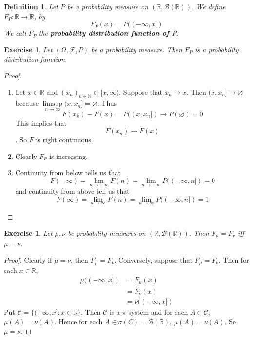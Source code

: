 \documentclass[12pt]{amsart}
\newtheorem{defn}[thm]{Definition}
\newtheorem{ex}[thm]{Exercise}
\newcommand{\sig}{\sigma}
\newcommand{\Om}{\Omega}
\newcommand{\N}{\mathbb{N}}
\newcommand{\R}{\mathbb{R}}
\newcommand{\MC}{\mathcal{C}}
\newcommand{\MB}{\mathcal{B}}
\newcommand{\MF}{\mathcal{F}}
\begin{document}
	\begin{defn}
		Let $P $ be a probability measure on $(\R, \MB(\R))$. We define $F_P: \R \rightarrow \R$, by $$F_P(x) = P((-\infty, x])$$ We call $F_P$ the \textbf{probability distribution function of $P$}.
	\end{defn}
	
	\begin{ex}
		Let $(\Om, \MF, P)$ be a probability measure. Then $F_P$ is a probability distribution function.
	\end{ex}
	
	\begin{proof}
		\begin{enumerate}
			\item Let $x \in \R$ and $(x_n)_{n \in \N} \subset [x, \infty)$. Suppose that $x_n \rightarrow x$. Then $(x, x_n] \rightarrow \varnothing$ because $\limsup\limits_{n \rightarrow \infty} (x,x_n] = \varnothing$. Thus $$F(x_n) - F(x) = P((x, x_n]) \rightarrow P(\varnothing) = 0$$This implies that $$F(x_n) \rightarrow F(x)$$. So $F$ is right continuous.
			\item Clearly $F_P$ is increasing.
			\item Continuity from below tells us that $$F(-\infty) = \lim_{n \rightarrow -\infty}F(n) = \lim_{n \rightarrow -\infty}P((-\infty,n]) = 0$$ and continuity from above tell us that $$F(\infty)  = \lim_{n \rightarrow \infty}F(n) = \lim_{n \rightarrow \infty}P((-\infty, n]) = 1$$ 
		\end{enumerate}
	\end{proof}
	
	\begin{ex}
		Let $\mu, \nu$ be probability measures on $(\R, \MB(\R))$. Then $F_{\mu} = F_{\nu}$ iff $\mu = \nu$.  
	\end{ex}
	
	\begin{proof}
		Clearly if $\mu = \nu$, then $F_{\mu} = F_{\nu}$. Conversely, suppose that $F_{\mu} = F_{\nu}$. Then for each $x \in \R$, 
		\begin{align*}
			\mu((-\infty,x]) 
			&= F_{\mu}(x) \\
			&= F_{\nu}(x)  \\
			&= \nu((-\infty,x])
		\end{align*}
		Put $\MC = \{(-\infty,x]:x \in \R\} $. Then $\MC$ is a $\pi$-system and for each $A \in \MC$, $\mu(A) = \nu(A)$. Hence for each $A \in \sig(C) = \MB(\R)$, $\mu(A) = \nu(A)$. So $\mu = \nu$. 
	\end{proof}
	
\end{document}
